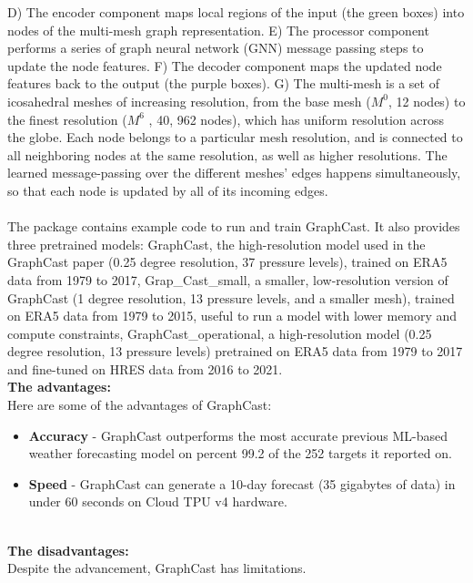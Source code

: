 \documentclass[../paper.tex]{subfiles}
\begin{document}
        D) The encoder component maps local regions of the input (the green boxes) into nodes of the multi-mesh graph representation.
        E) The processor component performs a series of graph neural network (GNN) message passing steps to update the node features.
        F) The decoder component maps the updated node features back to the output (the purple boxes).
        G) The multi-mesh is a set of icosahedral meshes of increasing resolution, from the base mesh ($M^0$, 12 nodes) to the finest resolution ($M^6$ , 40, 962 nodes), which has uniform resolution across the globe.
        Each node belongs to a particular mesh resolution, and is connected to all neighboring nodes at the same resolution, as well as higher resolutions.
        The learned message-passing over the different meshes' edges happens simultaneously, so that each node is updated by all of its incoming edges.
        \\\\
        The package contains example code to run and train GraphCast.
        It also provides three pretrained models: GraphCast, the high-resolution model used in the GraphCast paper (0.25 degree resolution, 37 pressure levels),
        trained on ERA5 data from 1979 to 2017, Grap\_Cast\_small, a smaller, low-resolution version of GraphCast (1 degree resolution,
        13 pressure levels, and a smaller mesh), trained on ERA5 data from 1979 to 2015, useful to run a model with lower memory and compute constraints,
        GraphCast\_operational, a high-resolution model (0.25 degree resolution, 13 pressure levels) pretrained on ERA5 data from 1979 to 2017
        and fine-tuned on HRES data from 2016 to 2021\cite{e2}.
        \hfill\\
        \textbf{The advantages:}\\
        Here are some of the advantages of GraphCast:
        \begin{itemize}
            \item \textbf{Accuracy} - GraphCast outperforms the most accurate previous ML-based weather forecasting model on percent 99.2 of the 252 targets it reported on\cite{e1}.
            \item \textbf{Speed} - GraphCast can generate a 10-day forecast (35 gigabytes of data) in under 60 seconds on Cloud TPU v4 hardware\cite{e1}.
        \end{itemize}
        \hfill\\
        \textbf{The disadvantages:}\\
        Despite the advancement, GraphCast has limitations. \\
\end{document}
